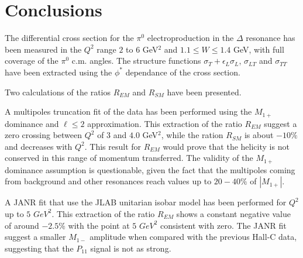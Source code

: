 \cia\vspace{-2 cm}
\section{Conclusions}
The differential cross section for the $\pi^0$ electroproduction in 
the $\Delta$ resonance has been measured in the $Q^2$ range $2$ to $6$ GeV$^2$
and $1.1 \le W \le 1.4$ GeV, with full coverage of the $\pi^0$ c.m. angles.
The structure functions $\sigma_T  + \epsilon_L \sigma_L$, $\sigma_{LT}$ and $\sigma_{TT}$ 
have been extracted using the $\phi^*$ dependance of the cross section.

Two calculations of the ratios  $R_{EM}$ and $R_{SM}$ have been presented.

A multipoles truncation fit of the data has been performed using the  $M_{1+}$ dominance and $\ell \le 2$
approximation.
This extraction of the ratio $R_{EM}$ suggest a zero crossing between $Q^2$ of $3$ and $4.0$ GeV$^2$,
while the ration $R_{SM}$ is about $-10\%$ and decreases with $Q^2$.
This result for $R_{EM}$ would prove that the helicity is not conserved in this range of momentum transferred.
The validity of the $M_{1+}$ dominance assumption is questionable, given the fact that the multipoles 
coming from background and other resonances reach values up to $20-40\% $ of $|M_{1+}|$.

A JANR fit that use the JLAB unitarian isobar model has been performed  for $Q^2$ up to $5$ $GeV^2$.
This extraction of the ratio $R_{EM}$ shows a constant negative value of around $-2.5\% $  with the point at $5$ $GeV^2$
consistent with zero.
The JANR fit suggest a smaller $M_{1-}$ amplitude when compared with the previous Hall-C data, suggesting 
that the $P_{11}$ signal is not as strong.






